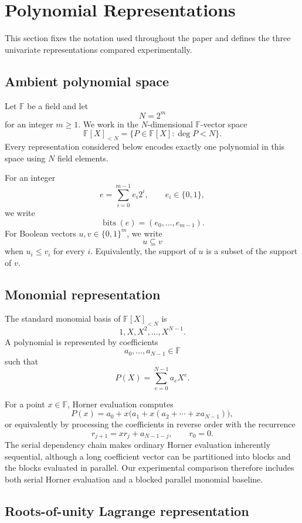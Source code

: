 \section{Polynomial Representations}
\label{sec:representations}

This section fixes the notation used throughout the paper and defines the
three univariate representations compared experimentally.

\subsection{Ambient polynomial space}

Let \(\mathbb{F}\) be a field and let
\[
N=2^m
\]
for an integer \(m\ge 1\).  We work in the \(N\)-dimensional
\(\mathbb{F}\)-vector space
\[
\mathbb{F}[X]_{<N}
=
\{P\in\mathbb{F}[X] : \deg P < N\}.
\]
Every representation considered below encodes exactly one polynomial in
this space using \(N\) field elements.

For an integer
\[
e=\sum_{i=0}^{m-1} e_i 2^i,
\qquad e_i\in\{0,1\},
\]
we write
\[
\operatorname{bits}(e)=(e_0,\ldots,e_{m-1}).
\]
For Boolean vectors \(u,v\in\{0,1\}^m\), we write
\[
u\subseteq v
\]
when \(u_i\le v_i\) for every \(i\).  Equivalently, the support of \(u\)
is a subset of the support of \(v\).

\subsection{Monomial representation}

The standard monomial basis of \(\mathbb{F}[X]_{<N}\) is
\[
1,X,X^2,\ldots,X^{N-1}.
\]
A polynomial is represented by coefficients
\[
a_0,\ldots,a_{N-1}\in\mathbb{F}
\]
such that
\[
P(X)=\sum_{e=0}^{N-1}a_eX^e.
\]

For a point \(x\in\mathbb{F}\), Horner evaluation computes
\[
P(x)
=
a_0+x\bigl(a_1+x(a_2+\cdots+x a_{N-1})\bigr),
\]
or equivalently by processing the coefficients in reverse order with the
recurrence
\[
r_{j+1}=xr_j+a_{N-1-j},
\qquad r_0=0.
\]
The serial dependency chain makes ordinary Horner evaluation inherently
sequential, although a long coefficient vector can be partitioned into
blocks and the blocks evaluated in parallel.  Our experimental comparison
therefore includes both serial Horner evaluation and a blocked parallel
monomial baseline.

\subsection{Roots-of-unity Lagrange representation}

